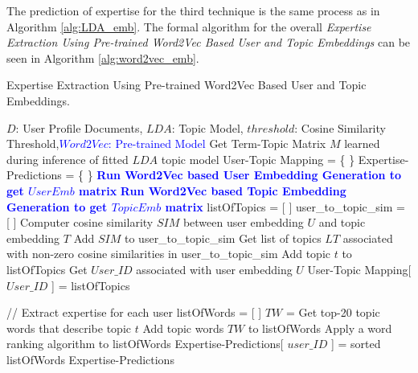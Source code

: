             The prediction of expertise for the third technique is the same process as in Algorithm \ref{alg:LDA_emb}. The formal algorithm for the overall \emph{Expertise Extraction Using Pre-trained Word2Vec Based User and Topic Embeddings} can be seen in Algorithm \ref{alg:word2vec_emb}.
        
            \begin{algorithm}
            \caption{Expertise Extraction Using Pre-trained Word2Vec Based User and Topic Embeddings.}
            \label{alg:word2vec_emb}
            \begin{algorithmic}[1]
               \REQUIRE $D$: User Profile Documents, $LDA$: Topic Model, $threshold$: Cosine Similarity Threshold,\textcolor{blue}{$Word2Vec$: Pre-trained Model}
                \STATE Get Term-Topic Matrix $M$ learned during inference of fitted $LDA$ topic model
                \STATE User-Topic Mapping = \{ \}
                \STATE Expertise-Predictions = \{ \}
                \STATE \textbf{\textcolor{blue}{Run Word2Vec based User Embedding Generation to get $UserEmb$ matrix}}
                \STATE \textbf{\textcolor{blue}{Run Word2Vec based Topic Embedding Generation to get $TopicEmb$ matrix}}
                \STATE
                    \STATE listOfTopics = [ ]
                    \STATE user\_to\_topic\_sim = [ ]
                        \STATE Computer cosine similarity $SIM$ between user embedding $U$ and topic embedding $T$
                        \STATE Add $SIM$ to user\_to\_topic\_sim
                    \ENDFOR
                    \STATE
                    \STATE Get list of topics $LT$ associated with non-zero cosine similarities in user\_to\_topic\_sim
                            \STATE Add topic $t$ to listOfTopics
                        \ENDIF
                    \ENDFOR
                    \STATE Get $User\_ID$ associated with user embedding $U$
                    \STATE User-Topic Mapping[ $User\_ID$ ] = listOfTopics
                    
                    \STATE
                    \STATE // Extract expertise for each user
                    \STATE listOfWords = [ ]
                        \STATE $TW$ = Get top-20 topic words that describe topic $t$
                        \STATE Add topic words $TW$ to listOfWords
                    \ENDFOR
                    \STATE Apply a word ranking algorithm to listOfWords
                    \STATE Expertise-Predictions[ $user\_ID$ ] = sorted listOfWords
                \ENDFOR
                \RETURN Expertise-Predictions
            \end{algorithmic}
            \end{algorithm}
            
